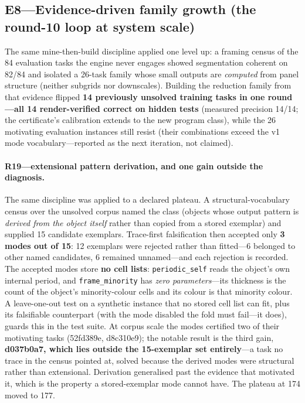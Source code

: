 \documentclass[11pt]{article}
\begin{document}
\subsection{E8---Evidence-driven family growth (the round-10 loop at
  system scale)}

The same mine-then-build discipline applied one level up: a framing census
of the 84 evaluation tasks the engine never engages showed segmentation
coherent on 82/84 and isolated a 26-task family whose small outputs are
\emph{computed} from panel structure (neither subgrids nor downscales).
Building the reduction family from that evidence flipped \textbf{14
previously unsolved training tasks in one round---all 14 render-verified
correct on hidden tests} (measured precision 14/14; the certificate's
calibration extends to the new program class), while the 26 motivating
evaluation instances still resist (their combinations exceed the v1 mode
vocabulary---reported as the next iteration, not claimed).

\paragraph{R19---extensional pattern derivation, and one gain outside the
diagnosis.}
The same discipline was applied to a declared plateau.  A
structural-vocabulary census over the unsolved corpus named the class
(objects whose output pattern is \emph{derived from the object itself}
rather than copied from a stored exemplar) and supplied 15 candidate
exemplars.  Trace-first falsification then accepted only \textbf{3 modes
out of 15}: 12 exemplars were rejected rather than fitted---6 belonged to
other named candidates, 6 remained unnamed---and each rejection is
recorded.  The accepted modes store \textbf{no cell lists}:
\texttt{periodic\_self} reads the object's own internal period, and
\texttt{frame\_minority} has \emph{zero parameters}---its thickness is the
count of the object's minority-colour cells and its colour is that minority
colour.  A leave-one-out test on a synthetic instance that no stored cell
list can fit, plus its falsifiable counterpart (with the mode disabled the
fold must fail---it does), guards this in the test suite.  At corpus scale
the modes certified two of their motivating tasks (52fd389e, d8c310e9); the
notable result is the third gain, \textbf{d037b0a7, which lies outside the
15-exemplar set entirely}---a task no trace in the census pointed at,
solved because the derived modes were structural rather than extensional.
Derivation generalised past the evidence that motivated it, which is the
property a stored-exemplar mode cannot have.  The plateau at 174 moved to
177.
\end{document}
